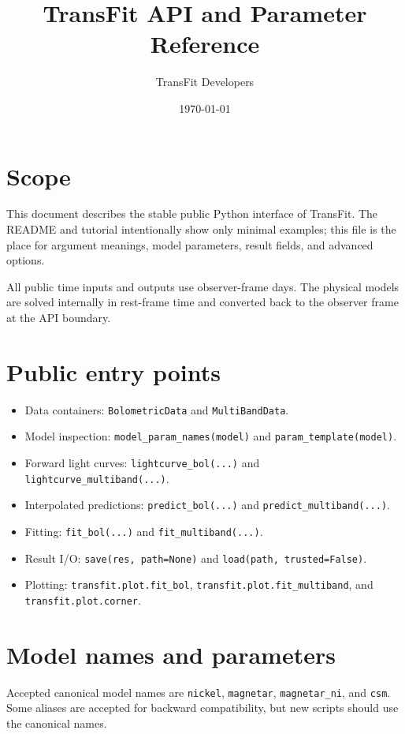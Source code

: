 \documentclass[11pt]{article}
\title{TransFit API and Parameter Reference}
\author{TransFit Developers}
\date{\today}
\begin{document}
\maketitle

\section{Scope}

This document describes the stable public Python interface of TransFit.  The
README and tutorial intentionally show only minimal examples; this file is the
place for argument meanings, model parameters, result fields, and advanced
options.

All public time inputs and outputs use observer-frame days.  The physical
models are solved internally in rest-frame time and converted back to the
observer frame at the API boundary.

\section{Public entry points}

\begin{itemize}[leftmargin=*]
  \item Data containers:
    \texttt{BolometricData} and \texttt{MultiBandData}.
  \item Model inspection:
    \texttt{model\_param\_names(model)} and
    \texttt{param\_template(model)}.
  \item Forward light curves:
    \texttt{lightcurve\_bol(...)} and
    \texttt{lightcurve\_multiband(...)}.
  \item Interpolated predictions:
    \texttt{predict\_bol(...)} and \texttt{predict\_multiband(...)}.
  \item Fitting:
    \texttt{fit\_bol(...)} and \texttt{fit\_multiband(...)}.
  \item Result I/O:
    \texttt{save(res, path=None)} and
    \texttt{load(path, trusted=False)}.
  \item Plotting:
    \texttt{transfit.plot.fit\_bol},
    \texttt{transfit.plot.fit\_multiband}, and
    \texttt{transfit.plot.corner}.
\end{itemize}

\section{Model names and parameters}

Accepted canonical model names are \texttt{nickel}, \texttt{magnetar},
\texttt{magnetar\_ni}, and \texttt{csm}.  Some aliases are accepted for
backward compatibility, but new scripts should use the canonical names.
\end{document}
